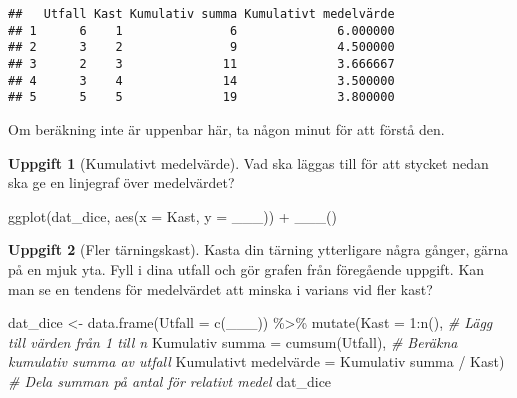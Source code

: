 \documentclass[
]{book}
\newenvironment{Shaded}{\begin{snugshade}}{\end{snugshade}}
\newcommand{\AttributeTok}[1]{\textcolor[rgb]{0.77,0.63,0.00}{#1}}
\newcommand{\CommentTok}[1]{\textcolor[rgb]{0.56,0.35,0.01}{\textit{#1}}}
\newcommand{\DecValTok}[1]{\textcolor[rgb]{0.00,0.00,0.81}{#1}}
\newcommand{\FunctionTok}[1]{\textcolor[rgb]{0.00,0.00,0.00}{#1}}
\newcommand{\NormalTok}[1]{#1}
\newcommand{\OtherTok}[1]{\textcolor[rgb]{0.56,0.35,0.01}{#1}}
\newcommand{\SpecialCharTok}[1]{\textcolor[rgb]{0.00,0.00,0.00}{#1}}
\newcommand{\StringTok}[1]{\textcolor[rgb]{0.31,0.60,0.02}{#1}}
\theoremstyle{definition}
\theoremstyle{definition}
\theoremstyle{definition}
\newtheorem{exercise}{Uppgift}[chapter]
\theoremstyle{definition}
\theoremstyle{remark}
\begin{document}
\begin{verbatim}
##   Utfall Kast Kumulativ summa Kumulativt medelvärde
## 1      6    1               6              6.000000
## 2      3    2               9              4.500000
## 3      2    3              11              3.666667
## 4      3    4              14              3.500000
## 5      5    5              19              3.800000
\end{verbatim}

Om beräkning inte är uppenbar här, ta någon minut för att förstå den.

\begin{exercise}[Kumulativt medelvärde]

Vad ska läggas till för att stycket nedan ska ge en linjegraf över medelvärdet?

\begin{Shaded}
\begin{Highlighting}[]
\FunctionTok{ggplot}\NormalTok{(dat\_dice, }\FunctionTok{aes}\NormalTok{(}\AttributeTok{x =}\NormalTok{ Kast, }\AttributeTok{y =}\NormalTok{ \_\_\_)) }\SpecialCharTok{+}
  \FunctionTok{\_\_\_}\NormalTok{()}
\end{Highlighting}
\end{Shaded}

\end{exercise}

\begin{exercise}[Fler tärningskast]

Kasta din tärning ytterligare några gånger, gärna på en mjuk yta. Fyll i dina utfall och gör grafen från föregående uppgift. Kan man se en tendens för medelvärdet att minska i varians vid fler kast?

\begin{Shaded}
\begin{Highlighting}[]
\NormalTok{dat\_dice }\OtherTok{\textless{}{-}} \FunctionTok{data.frame}\NormalTok{(}\AttributeTok{Utfall =} \FunctionTok{c}\NormalTok{(\_\_\_)) }\SpecialCharTok{\%\textgreater{}\%} 
  \FunctionTok{mutate}\NormalTok{(}\AttributeTok{Kast =} \DecValTok{1}\SpecialCharTok{:}\FunctionTok{n}\NormalTok{(),                                          }\CommentTok{\# Lägg till värden från 1 till n}
         \StringTok{\textasciigrave{}}\AttributeTok{Kumulativ summa}\StringTok{\textasciigrave{}} \OtherTok{=} \FunctionTok{cumsum}\NormalTok{(Utfall),                    }\CommentTok{\# Beräkna kumulativ summa av utfall}
         \StringTok{\textasciigrave{}}\AttributeTok{Kumulativt medelvärde}\StringTok{\textasciigrave{}} \OtherTok{=} \StringTok{\textasciigrave{}}\AttributeTok{Kumulativ summa}\StringTok{\textasciigrave{}} \SpecialCharTok{/}\NormalTok{ Kast)    }\CommentTok{\# Dela summan på antal för relativt medel}
\NormalTok{dat\_dice}
\end{Highlighting}
\end{Shaded}

\end{exercise}
\end{document}

